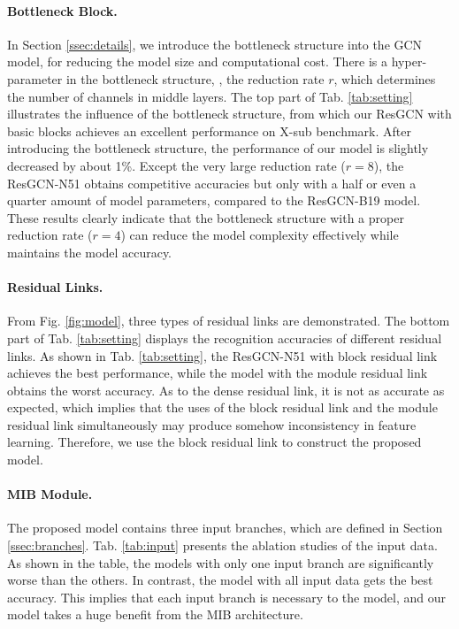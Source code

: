 \documentclass[sigconf]{acmart}
\begin{document}
\paragraph{Bottleneck Block.} In Section \ref{ssec:details}, we introduce the bottleneck structure into the GCN model, for reducing the model size and computational cost. There is a hyper-parameter in the bottleneck structure, \ie, the reduction rate $r$, which determines the number of channels in middle layers. The top part of Tab. \ref{tab:setting} illustrates the influence of the bottleneck structure, from which our ResGCN with basic blocks achieves an excellent performance on X-sub benchmark. After introducing the bottleneck structure, the performance of our model is slightly decreased by about 1\%. Except the very large reduction rate ($r=8$), the ResGCN-N51 obtains competitive accuracies but only with a half or even a quarter amount of model parameters, compared to the ResGCN-B19 model. These results clearly indicate that the bottleneck structure with a proper reduction rate ($r=4$) can reduce the model complexity effectively while maintains the model accuracy.

\paragraph{Residual Links.} From Fig. \ref{fig:model}, three types of residual links are demonstrated. The bottom part of Tab. \ref{tab:setting} displays the recognition accuracies of different residual links. As shown in Tab. \ref{tab:setting}, the ResGCN-N51 with block residual link achieves the best performance, while the model with the module residual link obtains the worst accuracy. As to the dense residual link, it is not as accurate as expected, which implies that the uses of the block residual link and the module residual link simultaneously may produce somehow inconsistency in feature learning. Therefore, we use the block residual link to construct the proposed model.

\paragraph{MIB Module.} The proposed model contains three input branches, which are defined in Section \ref{ssec:branches}. Tab. \ref{tab:input} presents the ablation studies of the input data. As shown in the table, the models with only one input branch are significantly worse than the others. In contrast, the model with all input data gets the best accuracy. This implies that each input branch is necessary to the model, and our model takes a huge benefit from the MIB architecture.
\end{document}
